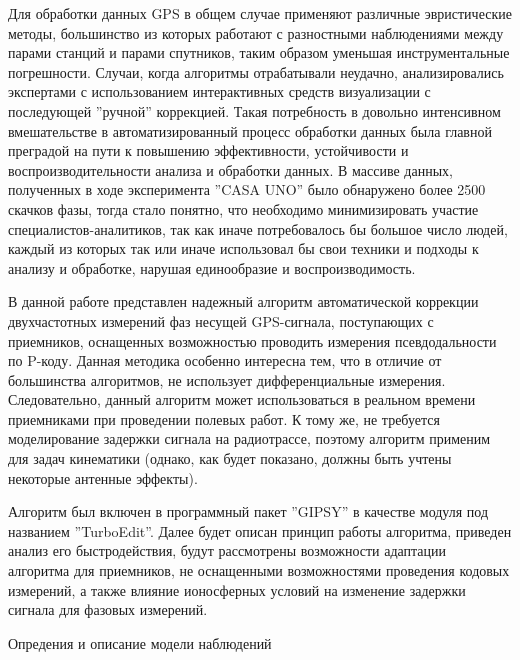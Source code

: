 \documentclass[12pt,a4paper]{article}
\begin{document}
Для обработки данных GPS в общем случае применяют различные эвристические
методы, большинство из которых работают с разностными наблюдениями между парами
станций и парами спутников, таким образом уменьшая инструментальные погрешности.
Случаи, когда алгоритмы отрабатывали неудачно, анализировались экспертами
с использованием интерактивных средств визуализации с последующей ''ручной''
коррекцией. Такая потребность в довольно интенсивном вмешательстве в
автоматизированный процесс обработки данных была главной преградой на пути к
повышению эффективности, устойчивости и воспроизводительности анализа и
обработки данных. В массиве данных, полученных в ходе
эксперимента ''CASA UNO'' было обнаружено более 2500 скачков фазы, тогда стало
понятно, что необходимо минимизировать участие специалистов-аналитиков, так как
иначе потребовалось бы большое число людей, каждый из которых так или иначе
использовал бы свои техники и подходы к анализу и обработке, нарушая
единообразие и воспроизводимость.

В данной работе представлен надежный алгоритм автоматической коррекции
двухчастотных измерений фаз несущей GPS-сигнала, поступающих с приемников,
оснащенных возможностью проводить измерения псевдодальности по P-коду. Данная
методика особенно интересна тем, что в отличие от большинства алгоритмов,
не использует дифференциальные измерения. Следовательно, данный алгоритм может
использоваться в реальном времени приемниками при проведении полевых работ.
К тому же, не требуется моделирование задержки сигнала на радиотрассе, поэтому
алгоритм применим для задач кинематики (однако, как будет показано, должны быть
учтены некоторые антенные эффекты).

Алгоритм был включен в программный пакет ''GIPSY'' в качестве модуля под
названием ''TurboEdit''. Далее будет описан принцип работы алгоритма,
приведен анализ его быстродействия, будут рассмотрены возможности адаптации
алгоритма для приемников, не оснащенными возможностями проведения кодовых
измерений, а также влияние ионосферных условий на изменение задержки сигнала
для фазовых измерений.

\begin{center} Опредения и описание модели наблюдений \end{center}
\end{document}
